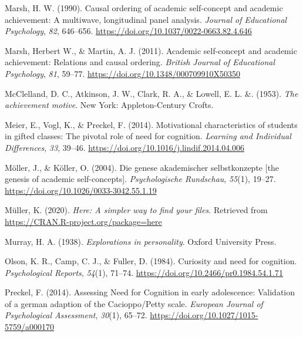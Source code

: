 \documentclass[
  man]{apa6}
\newlength{\cslhangindent}
\newlength{\cslentryspacingunit} %
\newenvironment{CSLReferences}[2] %
 {%
  \setlength{\parindent}{0pt}
  \ifodd #1
  \let\oldpar\par
  \def\par{\hangindent=\cslhangindent\oldpar}
  \fi
  \setlength{\parskip}{#2\cslentryspacingunit}
 }%
 {}
\begin{document}
\begin{CSLReferences}{1}{0}
\leavevmode{}%
Marsh, H. W. (1990). Causal ordering of academic self-concept and academic achievement: A multiwave, longitudinal panel analysis. \emph{Journal of Educational Psychology}, \emph{82}, 646--656. \url{https://doi.org/10.1037/0022-0663.82.4.646}

\leavevmode{}%
Marsh, Herbert W., \& Martin, A. J. (2011). Academic self-concept and academic achievement: Relations and causal ordering. \emph{British Journal of Educational Psychology}, \emph{81}, 59--77. \url{https://doi.org/10.1348/000709910X50350}

\leavevmode{}%
McClelland, D. C., Atkinson, J. W., Clark, R. A., \& Lowell, E. L. \&. (1953). \emph{The achievement motive}. New York: Appleton-Century Crofts.

\leavevmode{}%
Meier, E., Vogl, K., \& Preckel, F. (2014). Motivational characteristics of students in gifted classes: The pivotal role of need for cognition. \emph{Learning and Individual Differences}, \emph{33}, 39--46. \url{https://doi.org/10.1016/j.lindif.2014.04.006}

\leavevmode{}%
Möller, J., \& Köller, O. (2004). Die genese akademischer selbstkonzepte {[}the genesis of academic self-concepts{]}. \emph{Psychologische Rundschau}, \emph{55}(1), 19--27. \url{https://doi.org/10.1026/0033-3042.55.1.19}

\leavevmode{}%
Müller, K. (2020). \emph{Here: A simpler way to find your files}. Retrieved from \url{https://CRAN.R-project.org/package=here}

\leavevmode{}%
Murray, H. A. (1938). \emph{Explorations in personality}. Oxford University Press.

\leavevmode{}%
Olson, K. R., Camp, C. J., \& Fuller, D. (1984). Curiosity and need for cognition. \emph{Psychological Reports}, \emph{54}(1), 71--74. \url{https://doi.org/10.2466/pr0.1984.54.1.71}

\leavevmode{}%
Preckel, F. (2014). Assessing {Need} for {Cognition} in early adolescence: Validation of a german adaption of the {Cacioppo}/{Petty} scale. \emph{European Journal of Psychological Assessment}, \emph{30}(1), 65--72. \url{https://doi.org/10.1027/1015-5759/a000170}


\end{CSLReferences}
\end{document}
